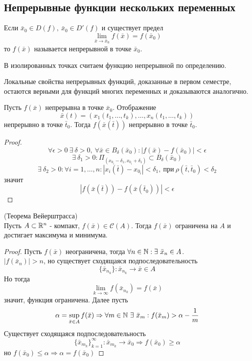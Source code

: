 \subsection{Непрерывные функции нескольких переменных}
\begin{definition}
    Если $\bar{x}_0\in D(f),\ \bar{x}_0\in D'(f)$ и существует предел 
    \[\lim\limits_{\bar{x}\to \bar{x}_0}f(\bar{x})=f(\bar{x}_0)\]
    то $f(\bar{x})$ называется непрерывной в точке $\bar{x}_0$.
\end{definition} 
\begin{comm}
    В изолированных точках считаем функцию непрерывной по определению.
\end{comm} 
\begin{comm}
    Локальные свойства непрерывных функций, доказанные в первом семестре, остаются
    верными для функций многих переменных и доказываются аналогично.
\end{comm} 
\begin{theorem}
    Пусть $f(\bar{x})$ непрерывна в точке $\bar{x}_0$. Отображение
    \[\bar{x}(t)=(x_1(t_1,\dots,t_k), \dots , x_n(t_1, \dots, t_k))\]
    непрерывно в точке $\bar{t}_0$. Тогда $f(\bar{x}(\bar{t}))$ непрерывно в точке $\bar{t}_0$.
\end{theorem} 
\begin{proof}
    \[\forall \epsilon>0\ \exists\ \delta>0,\ \forall \bar{x}\in B_{\delta}(\bar{x}_0): |f(\bar{x})-f(\bar{x}_0)|<\epsilon\]
    \[\exists\ \delta_1>0: \Pi_{(x_{0_i}-\delta_1, x_{0_i}+\delta_1)}\subset B_{\delta}(\bar{x}_0)\]
    \[\exists\ \delta_2>0: \forall i=1,\dots, n: |x_i(\bar{t})-x_{0_i}|<\delta_1,\ \text{при}\ \rho(\bar{t}, \bar{t}_0)<\delta_2\]
    значит
    \[|f(\bar{x}(\bar{t}))-f(\bar{x}(\bar{t}_0))|<\epsilon\]
\end{proof}
\begin{theorem} (Теорема Вейерштрасса)\\
    Пусть $A\subset \mathbb{R}^n$ - компакт, $f(\bar{x})\in \mathcal{C}(A)$. Тогда $f(\bar{x})$ ограничена на $A$ и достигает максимума и минимума.
\end{theorem} 
\begin{proof}
    Пусть $f(\bar{x})$ неограничена, тогда $\forall n\in \N: \exists\ \bar{x}_n\in A$.\\
    $|f(\bar{x}_n)|>n$, но существует сходящаяся подпоследовательность
    \[\{\bar{x}_{n_k}\}: \bar{x}_{n_k}\to \bar{x}\in A\] 
    Но тогда
    \[\lim\limits_{k\to \infty}f(\bar{x}_{n_k})=f(\bar{x})\]
    значит, функция ограничена.
    Далее пусть \[\alpha=\sup\limits_{\bar{x}\in A}f(\bar{x}) \Rightarrow \forall m\in \mathbb{N}\ \exists\ \bar{x}_m: f(\bar{x}_m)>\alpha-\frac{1}{m}\] 
    Существует сходящаяся подпоследовательность
    \[\{\bar{x}_{m_k}\}_{k=1}^{\infty}: \bar{x}_{m_k}\to \bar{x}_0 \Rightarrow f(\bar{x}_0)\geq \alpha\] но $f(\bar{x}_0)\leq \alpha \Rightarrow \alpha= f(\bar{x}_0)$ 
\end{proof} 
